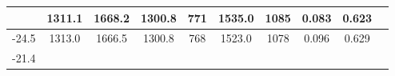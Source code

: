 \documentclass[a4paper,12pt]{article}
\begin{document}
\begin{longtable}{
     |
%    
    c|
%    
    c|
%    
    c|
%    
    c|
%    
    c|
%    
    c|
%    
    c|
%    
    c|
%    
    c|
%    
    c|
%    
    }
%        
        & 1311.1
%        

%        

%        
        & 1668.2
%        

%        

%        
        & 1300.8
%        

%        

%        
        & 771
%        

%        

%        
        & 1535.0
%        

%        

%        
        & 1085
%        

%        

%        
        & 0.083
%        

%        

%        
        & 0.623
%        

%        
        \\
        \hline

        

%        

%        
        -24.5
%        

%        

%        
        & 1313.0
%        

%        

%        
        & 1666.5
%        

%        

%        
        & 1300.8
%        

%        

%        
        & 768
%        

%        

%        
        & 1523.0
%        

%        

%        
        & 1078
%        

%        

%        
        & 0.096
%        

%        

%        
        & 0.629
%        

%        
        \\
        \hline

        

%        

%        
        -21.4
%        

%        


\end{longtable}
\end{document}
